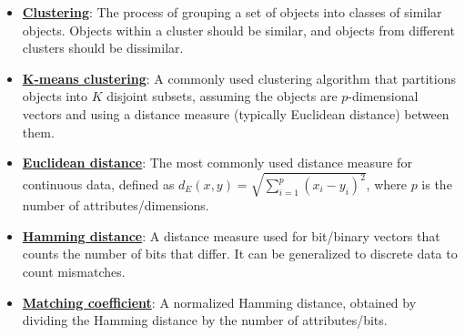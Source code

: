 \documentclass{article}%
\begin{document}
\begin{itemize}[leftmargin=*]%
\item \href{https://purdue.brightspace.com/d2l/common/assets/pdfjs-d2l-dist/1.0.14-legacy/web/viewer.html?file=\%2Fcontent\%2Fenforced\%2F1095467-wl.202510.CS.24300.001\%2F12L2-distance-clusters.pdf\%3Fou\%3D1095467\&lang=en-us\&container=d2l-fileviewer-rendered-pdf\&fullscreen=d2l-fileviewer-rendered-pdf-dialog\&height=667#page=4}{\textbf{Clustering}}: The process of grouping a set of objects into classes of similar objects. Objects within a cluster should be similar, and objects from different clusters should be dissimilar.%
\item \href{https://purdue.brightspace.com/d2l/common/assets/pdfjs-d2l-dist/1.0.14-legacy/web/viewer.html?file=\%2Fcontent\%2Fenforced\%2F1095467-wl.202510.CS.24300.001\%2F12L2-distance-clusters.pdf\%3Fou\%3D1095467\&lang=en-us\&container=d2l-fileviewer-rendered-pdf\&fullscreen=d2l-fileviewer-rendered-pdf-dialog\&height=667#page=21}{\textbf{K{-}means clustering}}: A commonly used clustering algorithm that partitions objects into $K$ disjoint subsets, assuming the objects are $p$-dimensional vectors and using a distance measure (typically Euclidean distance) between them.%
\item \href{https://purdue.brightspace.com/d2l/common/assets/pdfjs-d2l-dist/1.0.14-legacy/web/viewer.html?file=\%2Fcontent\%2Fenforced\%2F1095467-wl.202510.CS.24300.001\%2F12L2-distance-clusters.pdf\%3Fou\%3D1095467\&lang=en-us\&container=d2l-fileviewer-rendered-pdf\&fullscreen=d2l-fileviewer-rendered-pdf-dialog\&height=667#page=17}{\textbf{Euclidean distance}}: The most commonly used distance measure for continuous data, defined as $d_E(x, y) = \sqrt{\sum_{i=1}^p (x_i - y_i)^2}$, where $p$ is the number of attributes/dimensions.%
\item \href{https://purdue.brightspace.com/d2l/common/assets/pdfjs-d2l-dist/1.0.14-legacy/web/viewer.html?file=\%2Fcontent\%2Fenforced\%2F1095467-wl.202510.CS.24300.001\%2F12L2-distance-clusters.pdf\%3Fou\%3D1095467\&lang=en-us\&container=d2l-fileviewer-rendered-pdf\&fullscreen=d2l-fileviewer-rendered-pdf-dialog\&height=667#page=19}{\textbf{Hamming distance}}: A distance measure used for bit/binary vectors that counts the number of bits that differ. It can be generalized to discrete data to count mismatches.%
\item \href{https://purdue.brightspace.com/d2l/common/assets/pdfjs-d2l-dist/1.0.14-legacy/web/viewer.html?file=\%2Fcontent\%2Fenforced\%2F1095467-wl.202510.CS.24300.001\%2F12L2-distance-clusters.pdf\%3Fou\%3D1095467\&lang=en-us\&container=d2l-fileviewer-rendered-pdf\&fullscreen=d2l-fileviewer-rendered-pdf-dialog\&height=667#page=19}{\textbf{Matching coefficient}}: A normalized Hamming distance, obtained by dividing the Hamming distance by the number of attributes/bits.%

\end{itemize}
\end{document}
